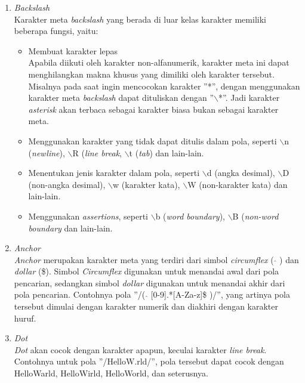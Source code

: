 \begin{enumerate}
	\item \textit{Backslash} \\
	Karakter meta \textit{backslash} yang berada di luar kelas karakter memiliki beberapa fungsi, yaitu:
	\begin{itemize}
		\item Membuat karakter lepas\\
		Apabila diikuti oleh karakter non-alfanumerik, karakter meta ini dapat menghilangkan makna khusus yang dimiliki oleh karakter tersebut. Misalnya pada saat ingin mencocokan karakter ''*'', dengan menggunakan karakter meta \textit{backslash} dapat dituliskan dengan ''$\backslash$*''. Jadi karakter \textit{asterisk} akan terbaca sebagai karakter biasa bukan sebagai karakter meta.
				
		\item Menggunakan karakter yang tidak dapat ditulis dalam pola, seperti $\backslash$n (\textit{newline}), $\backslash$R (\textit{line break}, $\backslash$t (\textit{tab}) dan lain-lain.
		
		\item Menentukan jenis karakter dalam pola, seperti $\backslash$d (angka desimal), $\backslash$D (non-angka desimal), $\backslash$w (karakter kata), $\backslash$W (non-karakter kata) dan lain-lain.
		
		\item Menggunakan \textit{assertions}, seperti $\backslash$b (\textit{word boundary}), $\backslash$B (\textit{non-word boundary} dan lain-lain.
		
	\end{itemize}
	
	\item \textit{Anchor}\\
	\textit{Anchor} merupakan karakter meta yang terdiri dari simbol \textit{circumflex} ( $\hat{}$ ) dan \textit{dollar} (\$). Simbol \textit{Circumflex} digunakan untuk menandai awal dari pola pencarian, sedangkan simbol \textit{dollar} digunakan untuk menandai akhir dari pola pencarian. Contohnya pola ''/( $\hat{}$ [0-9].*[A-Za-z]\$ )/'', yang artinya pola tersebut dimulai dengan karakter numerik dan diakhiri dengan karakter huruf.
	
	\item \textit{Dot} \\
	\textit{Dot} akan cocok dengan karakter apapun, keculai karakter \textit{line break}. Contohnya untuk pola ''/HelloW.rld/'', pola tersebut dapat cocok dengan HelloWarld, HelloWirld, HelloWorld, dan seterusnya.
	

\end{enumerate}

